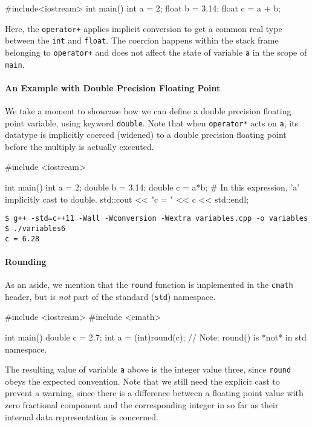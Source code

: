 \documentclass[12pt,letterpaper,twoside]{article}
\begin{document}
\begin{cpp}
#include<iostream>
int main() {
  int a = 2;
  float b = 3.14;
  float c = a + b;
}
\end{cpp}

Here, the \texttt{operator+} applies implicit conversion to get a
common real type between the \texttt{int} and
\texttt{float}. The coercion happens within the stack frame belonging
to \texttt{operator+} and does not affect the state of variable
\texttt{a} in the scope of \texttt{main}. 

\paragraph{An Example with Double Precision Floating Point} We take a moment to
showcase how we can define a double precision floating point
variable, using keyword \texttt{double}. Note that when
\texttt{operator*} acts on \texttt{a}, its datatype is implicitly
coerced (widened) to a double precision floating point before the
multiply is actually executed.
\begin{cpp}
#include <iostream>

int main() {
  int    a = 2;
  double b = 3.14;
  double c = a*b;   # In this expression, 'a' implicitly cast to double.
  std::cout << "c = " << c << std::endl;
}
\end{cpp}

\begin{verbatim}
$ g++ -std=c++11 -Wall -Wconversion -Wextra variables.cpp -o variables
$ ./variables6
c = 6.28
\end{verbatim}

\paragraph{Rounding} As an aside, we mention that the \texttt{round}
function is implemented in the \texttt{cmath} header, but is
\emph{not} part of the standard (\texttt{std}) namespace.
\begin{cpp}
#include <iostream>
#include <cmath>

int main() {
  double c = 2.7;
  int a = (int)round(c);  // Note: round() is *not* in std namespace.
}
\end{cpp}

The resulting value of variable \texttt{a} above is the integer value three,
since \texttt{round} obeys the expected convention.
Note that we still need the explicit cast to prevent a warning, since
there is a difference between a floating point value with zero
fractional component and the corresponding integer in so far as their
internal data representation is concerned.
\end{document}
